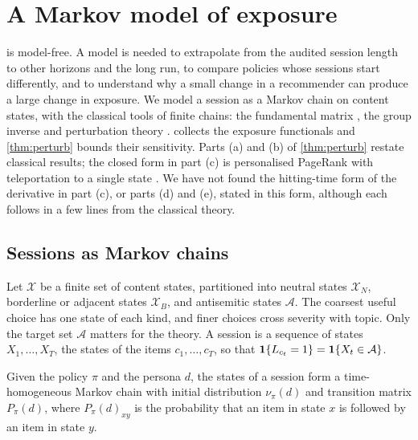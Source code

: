 \providecommand{\osc}{\operatorname{osc}}

\section{A Markov model of exposure}\label{sec:markov}

 is model-free. A model is needed to extrapolate from the audited session length to other horizons and the long run, to compare policies whose sessions start differently, and to understand why a small change in a recommender can produce a large change in exposure. We model a session as a Markov chain on content states, with the classical tools of finite chains: the fundamental matrix \citep{kemeny1960}, the group inverse \citep{meyer1975} and perturbation theory \citep{schweitzer1968,meyer1980,seneta1988,cho2000,cho2001}.  collects the exposure functionals and \cref{thm:perturb} bounds their sensitivity. Parts (a) and (b) of \cref{thm:perturb} restate classical results; the closed form in part (c) is personalised PageRank with teleportation to a single state \citep{page1999,jeh2003}. We have not found the hitting-time form of the derivative in part (c), or parts (d) and (e), stated in this form, although each follows in a few lines from the classical theory.

\subsection{Sessions as Markov chains}\label{sec:markov-model}

Let $\mathcal X$ be a finite set of content states, partitioned into neutral states $\mathcal X_N$, borderline or adjacent states $\mathcal X_B$, and antisemitic states $\mathcal A$. The coarsest useful choice has one state of each kind, and finer choices cross severity with topic. Only the target set $\mathcal A$ matters for the theory. A session is a sequence of states $X_1,\dots,X_T$, the states of the items $c_1,\dots,c_T$, so that $\mathbf{1}\!\left\{L_{c_t}=1\right\}=\mathbf{1}\!\left\{X_t\in\mathcal A\right\}$.

\begin{assumption}\label{asm:markov}
Given the policy $\pi$ and the persona $d$, the states of a session form a time-homogeneous Markov chain with initial distribution $\nu_\pi(d)$ and transition matrix $P_\pi(d)$, where $P_\pi(d)_{xy}$ is the probability that an item in state $x$ is followed by an item in state $y$.
\end{assumption}

